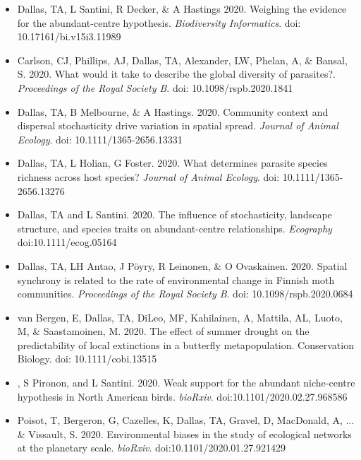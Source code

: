 \documentclass[]{CV}
\begin{document}
{}

\begin{itemize}

\item {\mefont Dallas, TA}, L Santini, R Decker, \& A Hastings 2020. Weighing the evidence for the abundant-centre hypothesis. \textit{Biodiversity Informatics}. doi: 10.17161/bi.v15i3.11989 

\item Carlson, CJ, Phillips, AJ, {\mefont Dallas, TA}, Alexander, LW, Phelan, A, \& Bansal, S. 2020. What would it take to describe the global diversity of parasites?. \textit{Proceedings of the Royal Society B}. doi: 10.1098/rspb.2020.1841

\item {\mefont Dallas, TA}, B Melbourne, \& A Hastings. 2020. Community context and dispersal stochasticity drive variation in spatial spread. \textit{Journal of Animal Ecology}. doi: 10.1111/1365-2656.13331


\item {\mefont Dallas, TA}, L Holian, G Foster. 2020. What determines parasite species richness across host species? \textit{Journal of Animal Ecology}. doi: 10.1111/1365-2656.13276

\item {\mefont Dallas, TA} and L Santini. 2020. The influence of stochasticity, landscape structure, and species traits on abundant-centre relationships. \textit{Ecography} doi:10.1111/ecog.05164

\item {\mefont Dallas, TA}, LH Antao, J Pöyry, R Leinonen, \& O Ovaskainen. 2020. Spatial synchrony is related to the rate of environmental change in Finnish moth communities. \textit{Proceedings of the Royal Society B}. doi: 10.1098/rspb.2020.0684

\item van Bergen, E, {\mefont Dallas, TA}, DiLeo, MF, Kahilainen, A, Mattila, AL, Luoto, M, \& Saastamoinen, M. 2020. The effect of summer drought on the predictability of local extinctions in a butterfly metapopulation. Conservation Biology. doi: 10.1111/cobi.13515

\item {}, S Pironon, and L Santini. 2020. Weak support for the abundant niche-centre hypothesis in North American birds. \textit{bioRxiv}. doi:10.1101/2020.02.27.968586

\item \OA Poisot, T, Bergeron, G, Cazelles, K, {\mefont Dallas, TA}, Gravel, D, MacDonald, A, ... \& Vissault, S. 2020. Environmental biases in the study of ecological networks at the planetary scale. \textit{bioRxiv}. doi:10.1101/2020.01.27.921429

\end{itemize}
\end{document}
